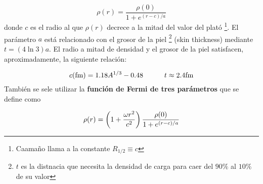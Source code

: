 \begin{equation}
    \rho (r) = \frac{\rho(0)}{1+e^{(r-c)/a}}
\end{equation}
donde $c$ es el radio al que $\rho(r)$ decrece a la mitad del valor del plató \footnote{Caamaño llama a la constante $R_{1/2}\equiv c$}. El parámetro $a$ está relacionado con el grosor de la piel \footnote{$t$ es la distnacia que necesita la densidad de carga para caer del $90\%$ al $10\%$ de su valor} (skin thickness) mediante $t=(4\ln 3)a$. El radio a mitad de densidad y el grosor de la piel satisfacen, aproximadamente, la siguiente relación:

\begin{equation}
    c(\unit{\fm}) = 1.18A^{1/3} - 0.48 \tquad t \approx 2.4 \unit{\fm}
\end{equation}
También se sele utilizar la \textbf{función de Fermi de tres parámetros} que se define como

\begin{equation}
    \rho (r) = \left( 1+ \frac{\omega r^2}{c^2} \right) \frac{\rho (0)}{1+e^{(r-c)/a}} 
\end{equation}



